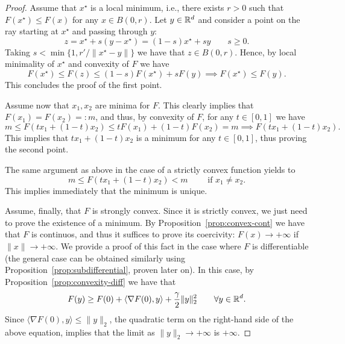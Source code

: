  \begin{proof}
     Assume that $x^\star$ is a local minimum, i.e., there exists $r>0$ such that $F(x^\star)\le F(x)$ for any $x\in B(0,r)$.
     Let $y\in \mathbb{R}^d$ and consider a point on the ray starting at $x^\star$ and passing through $y$:
     \begin{equation}
         z = x^\star + s (y-x^\star) =   (1-s)x^\star + s y\qquad s\ge 0.
     \end{equation}
     Taking $s < \min\{1, r'/\|x^\star - y\|\}$ we have that $z\in B(0,r)$. Hence, by local minimality of $x^\star$ and convexity of $F$ we have
     \begin{equation}
         F(x^\star) \le F(z) \le (1-s)F(x^\star) + s F(y) \implies F(x^\star) \le F(y).
     \end{equation}
     This concludes the proof of the first point.
 
     Assume now that $x_1,x_2$ are minima for $F$. This clearly implies that $F(x_1)=F(x_2) =: m$, and thus, by convexity of $F$, for any $t\in [0,1]$ we have
     \begin{equation}
         m \le F(t x_1 + (1-t)x_2) \le t F(x_1) +(1-t) F(x_2) = m \implies F(t x_1 + (1-t)x_2).
     \end{equation}
     This implies that $t x_1 + (1-t)x_2$ is a minimum for any $t\in [0,1]$, thus proving the second point.
 
     The same argument as above in the case of a strictly convex function yields to
     \begin{equation}
         m \le F(tx_1+(1-t)x_2) < m \qquad \text{ if } x_1\neq x_2.
     \end{equation}
     This implies immediately that the minimum is unique.
 
     Assume, finally, that $F$ is strongly convex. Since it is strictly convex, we just need to prove the existence of a minimum.
     By Proposition~\ref{prop:convex-cont} we have that $F$ is continuos, and thus it suffices to prove its coercivity: $F(x)\to +\infty$ if $\|x\|\to +\infty$.
     We provide a proof of this fact in the case where $F$ is differentiable (the general case can be obtained similarly using Proposition~\ref{prop:subdifferential}, proven later on). In this case, by Proposition~\ref{prop:convexity-diff} we have that
     \begin{equation}
         F(y) \ge F(0)+\langle \nabla F(0),y\rangle +\frac\gamma2\|y\|_2^2 \qquad \forall y\in \mathbb{R}^d.
     \end{equation}
     Since $\langle \nabla F(0),y\rangle \le \|y\|_2$, the quadratic term on the right-hand side of the above equation, implies that the limit as $\|y\|_2\to +\infty$ is $+\infty$.
 \end{proof}
 
